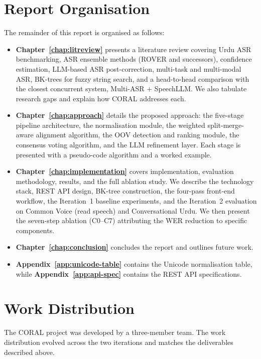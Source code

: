 \section{Report Organisation}
\label{sec:report-org}

The remainder of this report is organised as follows:

\begin{itemize}
  \item \textbf{Chapter~\ref{chap:litreview}} presents a literature review covering Urdu ASR benchmarking, ASR ensemble methods (ROVER and successors), confidence estimation, LLM-based ASR post-correction, multi-task and multi-modal ASR, BK-trees for fuzzy string search, and a head-to-head comparison with the closest concurrent system, Multi-ASR + SpeechLLM. We also tabulate research gaps and explain how CORAL addresses each.
  \item \textbf{Chapter~\ref{chap:approach}} details the proposed approach: the five-stage pipeline architecture, the normalisation module, the weighted split-merge-aware alignment algorithm, the OOV detection and ranking module, the consensus voting algorithm, and the LLM refinement layer. Each stage is presented with a pseudo-code algorithm and a worked example.
  \item \textbf{Chapter~\ref{chap:implementation}} covers implementation, evaluation methodology, results, and the full ablation study. We describe the technology stack, REST API design, BK-tree construction, the four-pass front-end workflow, the Iteration~1 baseline experiments, and the Iteration~2 evaluation on Common Voice (read speech) and Conversational Urdu. We then present the seven-step ablation (C0--C7) attributing the WER reduction to specific components.
  \item \textbf{Chapter~\ref{chap:conclusion}} concludes the report and outlines future work.
  \item \textbf{Appendix~\ref{app:unicode-table}} contains the Unicode normalisation table, while \textbf{Appendix~\ref{app:api-spec}} contains the REST API specifications.
\end{itemize}

\section{Work Distribution}
\label{sec:work-dist}

The CORAL project was developed by a three-member team. The work distribution evolved across the two iterations and matches the deliverables described above.

